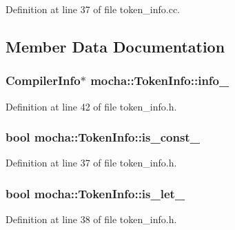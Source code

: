 Definition at line 37 of file token\_\-info.cc.



\subsection{Member Data Documentation}
\hypertarget{classmocha_1_1_token_info_a01f9f92c6a6b74432d284a079b1f656c}{
\subsubsection[{info\_\-}]{\setlength{\rightskip}{0pt plus 5cm}CompilerInfo$\ast$ {\bf mocha::TokenInfo::info\_\-}}}
\label{classmocha_1_1_token_info_a01f9f92c6a6b74432d284a079b1f656c}


Definition at line 42 of file token\_\-info.h.

\hypertarget{classmocha_1_1_token_info_aba23d888206ca283bcb9e51100ca49ee}{
\subsubsection[{is\_\-const\_\-}]{\setlength{\rightskip}{0pt plus 5cm}bool {\bf mocha::TokenInfo::is\_\-const\_\-}}}
\label{classmocha_1_1_token_info_aba23d888206ca283bcb9e51100ca49ee}


Definition at line 37 of file token\_\-info.h.

\hypertarget{classmocha_1_1_token_info_a6d1ecdd8db574d8244da19b7553ab932}{
\subsubsection[{is\_\-let\_\-}]{\setlength{\rightskip}{0pt plus 5cm}bool {\bf mocha::TokenInfo::is\_\-let\_\-}}}
\label{classmocha_1_1_token_info_a6d1ecdd8db574d8244da19b7553ab932}


Definition at line 38 of file token\_\-info.h.

